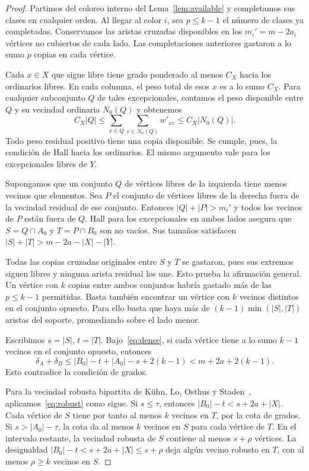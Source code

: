 \documentclass[11pt]{article}
\begin{document}
\begin{proof}
Partimos del coloreo interno del Lema~\ref{lem:available} y completamos sus clases en cualquier orden. Al llegar al color \(i\), sea \(p\le k-1\) el número de clases ya completadas. Conservamos las aristas cruzadas disponibles en los \(m_i'=m-2a_i\) vértices no cubiertos de cada lado. Las completaciones anteriores gastaron a lo sumo \(p\) copias en cada vértice.

Cada \(x\in X\) que sigue libre tiene grado ponderado al menos \(C_X\) hacia los ordinarios libres. En cada columna, el peso total de esos \(x\) es a lo sumo \(C_X\). Para cualquier subconjunto \(Q\) de tales excepcionales, contamos el peso disponible entre \(Q\) y su vecindad ordinaria \(N_0(Q)\) y obtenemos
\[
   C_X|Q|\le \sum_{x\in Q}\sum_{v\in N_0(Q)}
             w'_{xv}\le C_X|N_0(Q)|.
\]
Todo peso residual positivo tiene una copia disponible. Se cumple, pues, la condición de Hall hacia los ordinarios. El mismo argumento vale para los excepcionales libres de \(Y\).

Supongamos que un conjunto \(Q\) de vértices libres de la izquierda tiene menos vecinos que elementos. Sea \(P\) el conjunto de vértices libres de la derecha fuera de la vecindad residual de ese conjunto. Entonces \(|Q|+|P|>m_i'\) y todos los vecinos de \(P\) están fuera de \(Q\). Hall para los excepcionales en ambos lados asegura que \(S=Q\cap A_0\) y \(T=P\cap B_0\) son no vacíos. Sus tamaños satisfacen \(|S|+|T|>m-2a-|X|-|Y|\).

Todas las copias cruzadas originales entre \(S\) y \(T\) se gastaron, pues sus extremos siguen libres y ninguna arista residual los une. Esto prueba la afirmación general. Un vértice con \(k\) copias entre ambos conjuntos habría gastado más de las \(p\le k-1\) permitidas. Basta también encontrar un vértice con \(k\) vecinos distintos en el conjunto opuesto. Para ello basta que haya más de \((k-1)\min(|S|,|T|)\) aristas del soporte, promediando sobre el lado menor.

Escribimos \(s=|S|\), \(t=|T|\). Bajo~\eqref{eq:dense}, si cada vértice tiene a lo sumo \(k-1\) vecinos en el conjunto opuesto, entonces
\[
 \delta_A+\delta_B\le |B_0|-t+|A_0|-s+2(k-1)<m+2a+2(k-1).
\]
Esto contradice la condición de grados.

Para la vecindad robusta bipartita de K\"uhn, Lo, Osthus y Staden~\cite{KLOS}, aplicamos~\eqref{eq:robust} como sigue. Si \(s\le\tau\), entonces \(|B_0|-t<s+2a+|X|\). Cada vértice de \(S\) tiene por tanto al menos \(k\) vecinos en \(T\), por la cota de grados. Si \(s>|A_0|-\tau\), la cota da al menos \(k\) vecinos en \(S\) para cada vértice de \(T\). En el intervalo restante, la vecindad robusta de \(S\) contiene al menos \(s+\rho\) vértices. La desigualdad \(|B_0|-t<s+2a+|X|\le s+\rho\) deja algún vecino robusto en \(T\), con al menos \(\rho\ge k\) vecinos en \(S\).


\end{proof}
\end{document}
